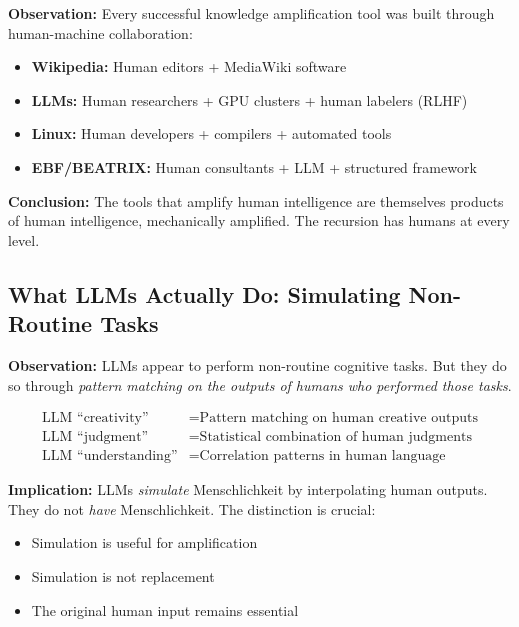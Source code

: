 \begin{tcolorbox}[colback=yellow!5!white, colframe=yellow!75!black,
    title=\textbf{The Recursion Principle}]
\textbf{Observation:} Every successful knowledge amplification tool was built through human-machine collaboration:

\begin{itemize}[nosep]
    \item \textbf{Wikipedia:} Human editors + MediaWiki software
    \item \textbf{LLMs:} Human researchers + GPU clusters + human labelers (RLHF)
    \item \textbf{Linux:} Human developers + compilers + automated tools
    \item \textbf{EBF/BEATRIX:} Human consultants + LLM + structured framework
\end{itemize}

\textbf{Conclusion:} The tools that amplify human intelligence are themselves products of human intelligence, mechanically amplified. The recursion has humans at every level.
\end{tcolorbox}

\subsection{What LLMs Actually Do: Simulating Non-Routine Tasks}

\begin{tcolorbox}[colback=red!5!white, colframe=red!75!black,
    title=\textbf{Critical Insight: LLMs Simulate, Not Perform}]
\textbf{Observation:} LLMs appear to perform non-routine cognitive tasks. But they do so through \textit{pattern matching on the outputs of humans who performed those tasks}.

\begin{align}
\text{LLM ``creativity''} &= \text{Pattern matching on human creative outputs} \\
\text{LLM ``judgment''} &= \text{Statistical combination of human judgments} \\
\text{LLM ``understanding''} &= \text{Correlation patterns in human language}
\end{align}

\textbf{Implication:} LLMs \textit{simulate} Menschlichkeit by interpolating human outputs. They do not \textit{have} Menschlichkeit. The distinction is crucial:
\begin{itemize}[nosep]
    \item Simulation is useful for amplification
    \item Simulation is not replacement
    \item The original human input remains essential
\end{itemize}
\end{tcolorbox}


